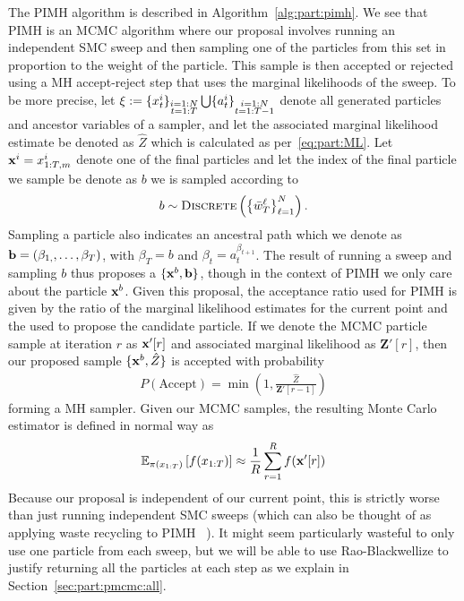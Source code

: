 The PIMH algorithm is described in Algorithm~\ref{alg:part:pimh}.  We see that PIMH is an MCMC
algorithm where our proposal involves running an independent SMC
sweep and then sampling one of the particles from this set in proportion to
the weight of the particle.
  This sample is then accepted or rejected using a MH accept-reject
step that  uses the marginal likelihoods of the sweep.  
To be more precise, let $\mathbf{\xi} := \{x_{t}^i\}_{\substack{i=1:N\\t=1:T}} \bigcup \{a_{t}^i\}_{\substack{i=1:N\\t=1:T-1}}$
denote all generated particles and ancestor variables of a \smc sampler, and let the associated
marginal likelihood estimate be denoted as $\hat{Z}$ which is calculated as per~\eqref{eq:part:ML}.
Let $\mathbf{x}^i = x_{1:T,m}^i$ denote one of the final particles and let the index of the final
particle we sample be denote as $b$ we is sampled according to
\begin{align}
\label{eq:part:b}
b \sim \operatorname*{\textsc{Discrete}}\left(\left\{\bar w_{T}^\ell\right\}_{\ell=1}^N\right).
\end{align}
Sampling a particle also indicates an ancestral path
which we denote as $\mathbf{b} = (\beta_{1,},\ldots,\beta_{T})$, with
$\beta_{T} = b$ and $\beta_{t} = a_{t}^{\beta_{t+1}}$.  The result of running a \smc sweep
and sampling $b$ thus proposes a $\{\mathbf{x}^{b},\mathbf{b}\}$, though in the context of PIMH we only care about the particle
$\mathbf{x}^b$.  Given this proposal, the acceptance ratio used for PIMH is
given by the ratio of the marginal likelihood estimates for the current point and the \smc used
to propose the candidate particle.  If we denote the MCMC particle sample at iteration $r$ as $\mathbf{x}'[r]$ and
associated marginal likelihood as $\mathbf{Z}'[r]$, then our proposed sample $\{\mathbf{x}^b,\hat{Z}\}$ 
is accepted with probability
\begin{align}
\label{eq:part:pimh-acc}
P(\text{Accept}) = \min \left(1,\frac{\hat{Z}}{\mathbf{Z}'[r-1]}\right)
\end{align}
forming a MH sampler.
Given our MCMC samples, the resulting Monte Carlo estimator is defined in normal way as
\begin{align}
\label{eq:part:pimh-est}
\mathbb{E}_{\pi (x_{1:T})} \left[f(x_{1:T})\right] \approx \frac{1}{R} \sum_{r=1}^{R} f(\mathbf{x}'[r])
\end{align}
Because our proposal
is independent of our current point, this is strictly worse than just running independent SMC sweeps
(which can also be thought of as applying waste recycling to PIMH ~\citep{frenkel2006waste}).  
It might seem particularly wasteful to only use
one particle from each sweep, but we will be able to use Rao-Blackwellize to justify
returning all the particles at each step as we explain in Section~\ref{sec:part:pmcmc:all}. 

